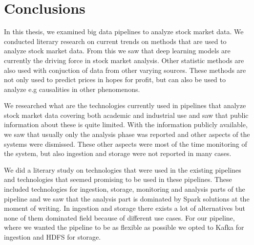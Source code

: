 \chapter{Conclusions}
\label{chapter:conclusions}



In this thesis, we examined big data pipelines to analyze stock market data.
We conducted literary research on current trends on methods that are used to analyze stock market data.
From this we saw that deep learning models are currently the driving force in stock market analysis.
Other statistic methods are also used with conjuction of data from other varying sources.
These methods are not only used to predict prices in hopes for profit, but can also be used to analyze e.g causalities in other phenomenons.

We researched what are the technologies currently used in pipelines that analyze stock market data covering both academic and industrial use and saw that public information about these is quite limited.
With the information publicly available, we saw that usually only the analysis phase was reported and other aspects of the systems were dismissed.
These other aspects were most of the time monitoring of the system, but also ingestion and storage were not reported in many cases.

We did a literary study on technologies that were used in the existing pipelines and technologies that seemed promising to be used in these pipelines.
These included technologies for ingestion, storage, monitoring and analysis parts of the pipeline and we saw that the analysis part is dominated by Spark solutions at the moment of writing.
In ingestion and storage there exists a lot of alternatives but none of them dominated field because of different use cases.
For our pipeline, where we wanted the pipeline to be as flexible as possible we opted to Kafka for ingestion and HDFS for storage.

